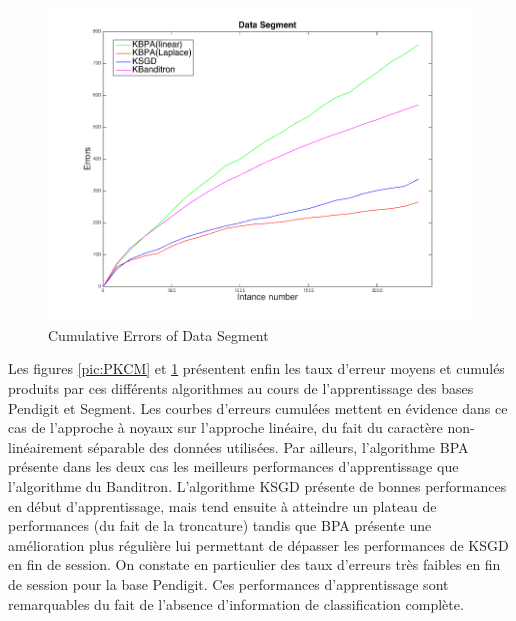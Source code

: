 \documentclass[twocolumn]{article}
\begin{document}
\begin{figure}[t!]
	\centerline{
		\includegraphics[width=\linewidth]{figs/Segment_kernel_CM.png}}
	\caption{Cumulative Errors of Data Segment}
	\label{pic:SKCM}
\end{figure}


Les figures  \ref{pic:PKCM} %
et \ref{pic:SKCM} 
présentent enfin les taux d'erreur moyens et cumulés produits par ces différents algorithmes au cours de l'apprentissage des bases Pendigit et Segment. Les courbes d'erreurs cumulées mettent en évidence dans ce cas de l'approche à noyaux sur l'approche linéaire, du fait du caractère non-linéairement séparable des données utilisées. Par ailleurs, l'algorithme BPA présente dans les deux cas les meilleurs performances d'apprentissage que l'algorithme du Banditron. L'algorithme KSGD présente de bonnes performances en début d'apprentissage, mais tend ensuite à atteindre un plateau de performances (du fait de la troncature) tandis que BPA présente une amélioration plus régulière lui permettant de dépasser les performances de KSGD en fin de session. On constate en particulier des taux d'erreurs très faibles en fin de session pour la base Pendigit. Ces performances d'apprentissage sont remarquables du fait de l'absence d'information de classification complète.  
\end{document}
